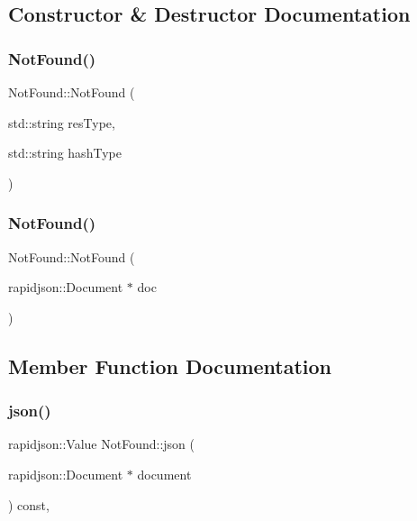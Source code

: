 \subsection{Constructor \& Destructor Documentation}
\mbox{\label{classNotFound_aa7fd834fc95565278a43553d7bae018c}} 
\subsubsection{\texorpdfstring{Not\+Found()}{NotFound()}\hspace{0.1cm}{\footnotesize\ttfamily [1/2]}}
{\footnotesize\ttfamily Not\+Found\+::\+Not\+Found (\begin{DoxyParamCaption}\item[{std\+::string}]{res\+Type,  }\item[{std\+::string}]{hash\+Type }\end{DoxyParamCaption})}

\mbox{\label{classNotFound_a52f321414fbd643f0af503f977f78078}} 
\subsubsection{\texorpdfstring{Not\+Found()}{NotFound()}\hspace{0.1cm}{\footnotesize\ttfamily [2/2]}}
{\footnotesize\ttfamily Not\+Found\+::\+Not\+Found (\begin{DoxyParamCaption}\item[{rapidjson\+::\+Document $\ast$}]{doc }\end{DoxyParamCaption})\hspace{0.3cm}{\ttfamily [explicit]}}



\subsection{Member Function Documentation}
\mbox{\label{classNotFound_a67ee661e6a87c681d167da585c106240}} 
\subsubsection{\texorpdfstring{json()}{json()}}
{\footnotesize\ttfamily rapidjson\+::\+Value Not\+Found\+::json (\begin{DoxyParamCaption}\item[{rapidjson\+::\+Document $\ast$}]{document }\end{DoxyParamCaption}) const\hspace{0.3cm}{\ttfamily [override]}, {\ttfamily [virtual]}}




